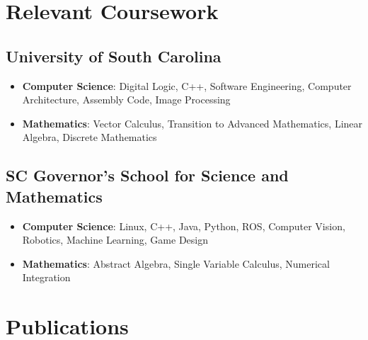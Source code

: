 \documentclass[10pt,letterpaper]{moderncv}
\begin{document}
\section{Relevant Coursework}
\subsection{\textbf{University of South Carolina}}
\begin{itemize}
  \item \textbf{Computer Science}: Digital Logic,  C++, Software Engineering, Computer Architecture, Assembly Code, Image Processing
  \item \textbf{Mathematics}: Vector Calculus, Transition to Advanced Mathematics, Linear Algebra, Discrete Mathematics
\end{itemize}
\subsection{\textbf{SC Governor's School for Science and Mathematics}}
\begin{itemize}
  \item \textbf{Computer Science}: Linux, C++, Java, Python, ROS, Computer Vision, Robotics, Machine Learning, Game Design
  \item \textbf{Mathematics}: Abstract Algebra, Single Variable Calculus, Numerical Integration
\end{itemize}

\section{Publications}
  \nocite{*}
  \printbibliography[heading=none]{}
\end{document}
